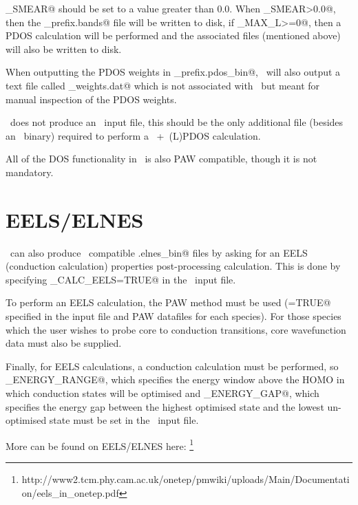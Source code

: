 \documentclass[a4paper,11pt,twoside]{book}
\begin{document}
{\verb@DOS_SMEAR@ should be set to a value greater than 0.0.
%
When \verb@DOS_SMEAR>0.0@, then the \verb@seedname_prefix.bands@ file will be written to disk, if \verb@PDOS_MAX_L>=0@, then a PDOS calculation will be performed and the associated files (mentioned above) will also be written to disk.

When outputting the PDOS weights in \verb@seedname_prefix.pdos_bin@, \onetep\  will also output a text file called \verb@pdos_weights.dat@ which is not associated with \optados\, but meant for manual inspection of the PDOS weights.

\onetep\  does not produce an \optados\ input file, this should be the only additional file (besides an \optados\ binary) required to perform a \onetep\ +\optados\ (L)PDOS calculation.

All of the DOS functionality in \onetep\  is also PAW compatible, though it is not mandatory.


\section{EELS/ELNES}

\onetep\  can also produce \optados\ compatible \verb@seedname.elnes_bin@ files by asking for an EELS\cite{tait:JPCM:2016} (conduction calculation) properties post-processing calculation. This is done by specifying \verb@COND_CALC_EELS=TRUE@ in the \onetep\ input file.

To perform an EELS calculation, the PAW method must be used (\verb@PAW=TRUE@ specified in the input file and PAW datafiles for each species). For those species which the user wishes to probe core to conduction transitions, core wavefunction data must also be supplied.

Finally, for EELS calculations, a conduction calculation must be performed, so \verb@COND_ENERGY_RANGE@, which specifies the energy window above the HOMO in which conduction states will be optimised and \verb@COND_ENERGY_GAP@, which specifies the energy gap between the highest optimised state and the lowest un-optimised state must be set in the \onetep\ input file.


More can be found on EELS/ELNES here: \footnote{http://www2.tcm.phy.cam.ac.uk/onetep/pmwiki/uploads/Main/Documentation/eels\_in\_onetep.pdf}


}
\end{document}
